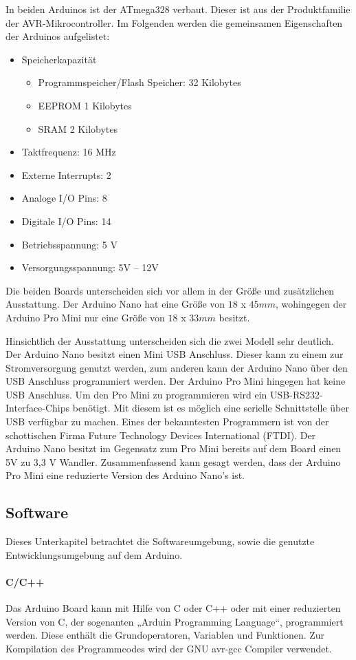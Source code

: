 In beiden Arduinos ist der ATmega328 verbaut. Dieser ist aus der Produktfamilie der AVR-Mikrocontroller. Im Folgenden werden die gemeinsamen Eigenschaften der Arduinos aufgelistet: 
\begin{itemize}
	\item Speicherkapazität
\begin{itemize}
	\item Programmspeicher/Flash Speicher: 32 Kilobytes
	\item EEPROM 1 Kilobytes
	\item SRAM 2 Kilobytes
\end{itemize}
	\item Taktfrequenz: 16 MHz
	\item Externe Interrupts: 2
	\item Analoge I/O Pins: 8
	\item Digitale I/O Pins: 14
	\item Betriebsspannung: 5 V
\item Versorgungsspannung: 5V – 12V
\end{itemize}
Die beiden Boards unterscheiden sich vor allem in der Größe und zusätzlichen Ausstattung.  Der Arduino Nano hat eine Größe von $18$ x $45 mm$, wohingegen der Arduino Pro Mini nur eine Größe von $18$ x $33 mm$ besitzt.

Hinsichtlich der Ausstattung unterscheiden sich die zwei Modell  sehr deutlich. Der Arduino Nano besitzt einen Mini USB Anschluss.  Dieser kann zu einem zur Stromversorgung genutzt werden, zum anderen kann der Arduino Nano über den USB Anschluss programmiert werden. Der Arduino Pro Mini hingegen hat keine USB Anschluss. Um den Pro Mini zu programmieren wird ein USB-RS232-Interface-Chips benötigt. Mit diesem ist es möglich eine serielle Schnittstelle über USB verfügbar zu machen. Eines der bekanntesten Programmern  ist von der schottischen Firma Future Technology Devices International (FTDI). Der Arduino Nano besitzt im Gegensatz zum Pro Mini bereits auf dem Board einen 5V zu 3,3 V Wandler. Zusammenfassend kann gesagt werden, dass der Arduino Pro Mini eine reduzierte Version des Arduino Nano’s ist.  


\subsection{Software}
Dieses Unterkapitel betrachtet die Softwareumgebung, sowie die genutzte Entwicklungsumgebung auf dem Arduino.
\paragraph{C/C++} Das Arduino Board kann mit Hilfe von C oder C++ oder mit einer reduzierten Version von C, der sogenanten „Arduin Programming Language“, programmiert werden. Diese enthält die Grundoperatoren, Variablen und Funktionen.  Zur Kompilation des  Programmcodes wird  der GNU avr-gcc Compiler verwendet. 

